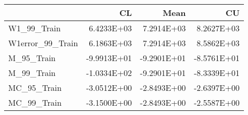 \begin{tabular}{lrrr}
\toprule
{} &          CL &        Mean &          CU \\
\midrule
W1\_99\_Train      &  6.4233E+03 &  7.2914E+03 &  8.2627E+03 \\
W1error\_99\_Train &  6.1863E+03 &  7.2914E+03 &  8.5862E+03 \\
M\_95\_Train       & -9.9913E+01 & -9.2901E+01 & -8.5761E+01 \\
M\_99\_Train       & -1.0334E+02 & -9.2901E+01 & -8.3339E+01 \\
MC\_95\_Train      & -3.0512E+00 & -2.8493E+00 & -2.6397E+00 \\
MC\_99\_Train      & -3.1500E+00 & -2.8493E+00 & -2.5587E+00 \\
\bottomrule
\end{tabular}
